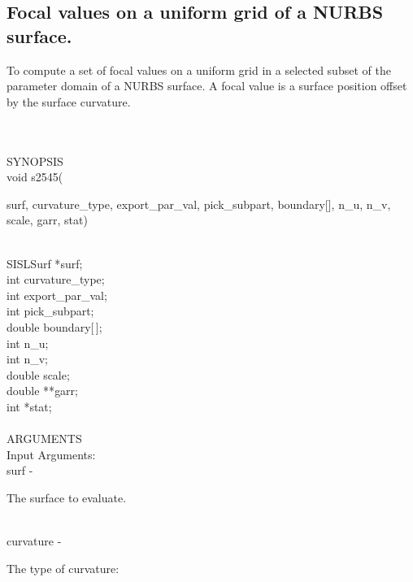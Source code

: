 \subsection{Focal values on a uniform grid of a NURBS surface.}
\begin{minipg1}
To compute a set of focal values on a uniform grid
            in a selected subset of the parameter domain of a
            NURBS surface. A focal value is a surface position offset
            by the surface curvature.
\end{minipg1} \\ \\
SYNOPSIS\\
        \> void s2545(\begin{minipg3}
            {\fov surf}, {\fov curvature\_type},  {\fov export\_par\_val},  {\fov pick\_subpart}, boundary[],  {\fov n\_u},  {\fov n\_v}, 
       {\fov scale}, {\fov garr},  {\fov stat})
                \end{minipg3}\\
                \>\>    SISLSurf \> *{\fov surf};\\
                \>\>    int \> {\fov curvature\_type};\\
                \>\>    int \> {\fov export\_par\_val};\\
                \>\>    int \> {\fov pick\_subpart};\\
                \>\>    double \> {\fov boundary}[\,];\\
                \>\>    int \> {\fov n\_u};\\
                \>\>    int \> {\fov n\_v};\\
                \>\>    double \> {\fov scale};\\
                \>\>    double \> **{\fov garr};\\
                \>\>    int \> *{\fov stat};\\
\\
ARGUMENTS\\
	\>Input Arguments:\\
        \>\>    {\fov surf}\> - \>  \begin{minipg2}
                     The surface to evaluate.
                               \end{minipg2}\\[0.8ex]
        \>\>    {\fov curvature}\> - \>  \begin{minipg2}
                     The type of curvature:
                               \end{minipg2}\\[0.8ex]
